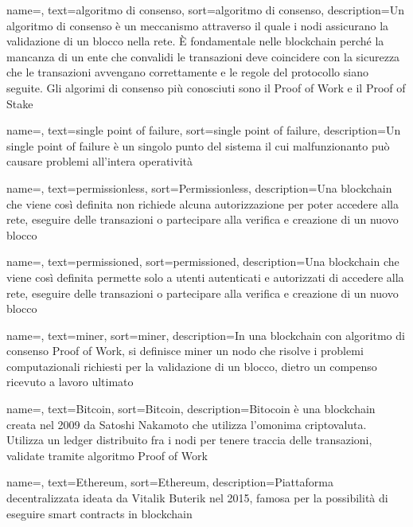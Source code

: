 {
    name=,
    text=algoritmo di consenso,
    sort=algoritmo di consenso,
    description={Un algoritmo di consenso è un meccanismo attraverso il quale i nodi assicurano la validazione di un blocco nella rete. È fondamentale nelle blockchain perché la mancanza di un ente che convalidi le transazioni deve coincidere con la sicurezza che le transazioni avvengano correttamente e le regole del protocollo siano seguite. Gli algorimi di consenso più conosciuti sono il Proof of Work e il Proof of Stake}
}

{
    name=,
    text=single point of failure,
    sort=single point of failure,
    description={Un single point of failure è un singolo punto del sistema il cui malfunzionanto può causare problemi all'intera operatività}
}

{
    name=,
    text=permissionless,
    sort=Permissionless,
    description={Una blockchain che viene così definita non richiede
alcuna autorizzazione per poter accedere alla rete, eseguire delle transazioni o partecipare
alla verifica e creazione di un nuovo blocco}
}

{
    name=,
    text=permissioned,
    sort=permissioned,
    description={Una blockchain che viene così definita permette solo a utenti autenticati e autorizzati di accedere alla rete, eseguire delle transazioni o partecipare alla verifica e creazione di un nuovo blocco}
}

{
    name=,
    text=miner,
    sort=miner,
    description={In una blockchain con algoritmo di consenso Proof of Work, si definisce miner un nodo che risolve i problemi computazionali richiesti per la validazione di un blocco, dietro un compenso ricevuto a lavoro ultimato}
}

{
    name=,
    text=Bitcoin,
    sort=Bitcoin,
    description={Bitocoin è una blockchain creata nel 2009 da Satoshi Nakamoto che utilizza l'omonima criptovaluta. Utilizza un ledger distribuito fra i nodi per tenere traccia delle transazioni, validate tramite algoritmo Proof of Work}
}

{
    name=,
    text=Ethereum,
    sort=Ethereum,
    description={Piattaforma decentralizzata ideata da Vitalik Buterik nel 2015, famosa per la possibilità di eseguire smart contracts in blockchain}
}

